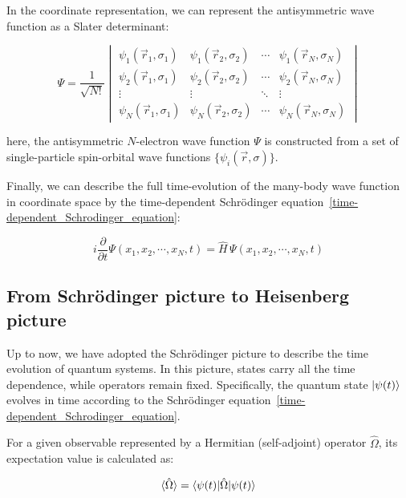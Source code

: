 In the coordinate representation, we can represent the antisymmetric wave function as a Slater determinant:

\begin{equation}
    \Psi = \frac{1}{\sqrt{N!}}
    \begin{vmatrix}
    \psi_1(\vec{r}_1,\sigma_1) & \psi_1(\vec{r}_2,\sigma_2) & \cdots & \psi_1(\vec{r}_N,\sigma_N)\\
    \psi_2(\vec{r}_1,\sigma_1) & \psi_2(\vec{r}_2,\sigma_2) & \cdots & \psi_2(\vec{r}_N,\sigma_N)\\
    \vdots & \vdots & \ddots & \vdots\\
    \psi_N(\vec{r}_1,\sigma_1) & \psi_N(\vec{r}_2,\sigma_2) & \cdots & \psi_N(\vec{r}_N,\sigma_N)
    \end{vmatrix}
\label{slater_determinant}
\end{equation}

here, the antisymmetric $N$-electron wave function $\Psi$ is constructed from a set of single-particle spin-orbital wave functions $\{\psi_i(\vec{r},\sigma)\}$.

Finally, we can describe the full time-evolution of the many-body wave function in coordinate space by the time-dependent Schrödinger equation~\eqref{time-dependent_Schrodinger_equation}:

\begin{equation}
    i\frac{\partial}{\partial t}\Psi(x_1,x_2,\cdots,x_N,t)
    = \hat{H}\,\Psi(x_1,x_2,\cdots,x_N,t)
\label{tdse_manybody_coord}
\end{equation}

\subsection{From Schrödinger picture to Heisenberg picture}

Up to now, we have adopted the Schrödinger picture to describe the time evolution of quantum systems. In this picture, states carry all the time dependence, while operators remain fixed. Specifically, the quantum state $\ket{\psi(t)}$ evolves in time according to the Schrödinger equation~\eqref{time-dependent_Schrodinger_equation}.

For a given observable represented by a Hermitian (self-adjoint) operator $\hat{\Omega}$, its expectation value is calculated as:

\begin{equation}
    \braket{\hat{\Omega}} = \braket{\psi(t)|\hat{\Omega}|\psi(t)}
\label{expectation_Hermitian}
\end{equation}


